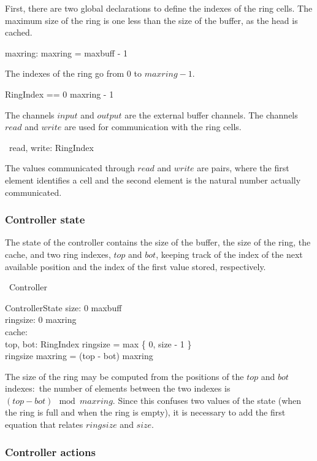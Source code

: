 \documentclass{article}
\begin{document}
First, there are two global declarations to define the indexes of the
ring cells.  The maximum size of the ring is one less than the size of
the buffer, as the head is cached.
\begin{axdef}
  maxring: \nat
  \where %
  maxring = maxbuff - 1
\end{axdef}
The indexes of the ring go from 0 to $maxring - 1$.
\begin{zed}
  RingIndex == 0 \upto maxring - 1
\end{zed}
The channels $input$ and $output$ are the external buffer channels.
The channels $read$ and $write$ are used for communication with the
ring cells.
\begin{zed}
  \circchannel\ read, write: RingIndex \times \nat
\end{zed}
The values communicated through $read$ and $write$ are pairs, where the
first element identifies a cell and the second element is the natural
number actually communicated.

\subsubsection{Controller state}

The state of the controller contains the size of the buffer, the size
of the ring, the cache, and two ring indexes, $top$ and $bot$, keeping
track of the index of the next available position and the index of the
first value stored, respectively.
\begin{zed}
  \circprocess\ Controller  \circbegin
\end{zed}
\begin{schema}{ControllerState}
  size: 0 \upto maxbuff
  \\ %
  ringsize: 0 \upto maxring
  \\ %
  cache: \nat
  \\ %
  top, bot: RingIndex
  \where %
  ringsize = max \{ 0, size - 1 \}
  \\ %
  ringsize \mod maxring = (top - bot) \mod maxring
\end{schema}
The size of the ring \pagebreak may be computed from the positions of
the $top $ and $bot$ indexes:~the number of elements between the two
indexes is $(top - bot) \mod maxring$.  Since this confuses two values
of the state (when the ring is full and when the ring is empty), it is
necessary to add the first equation that relates $ringsize$ and $size$.

\subsubsection{Controller actions}
\end{document}
